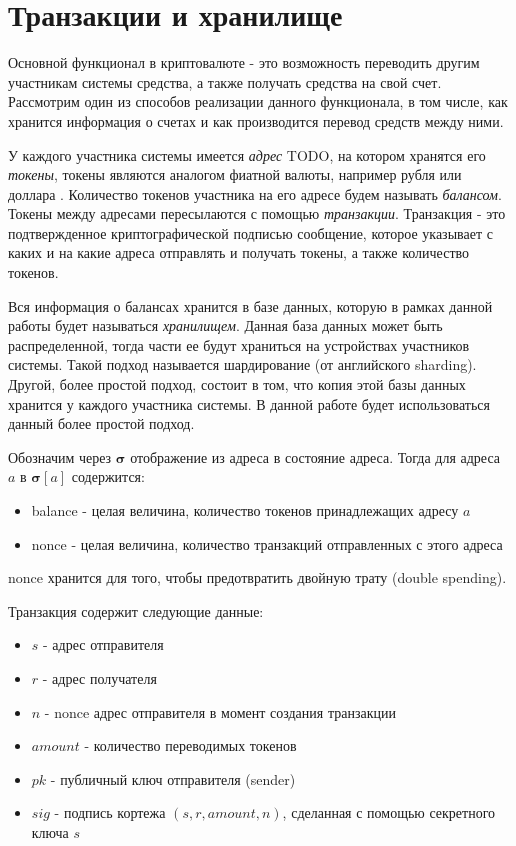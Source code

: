 \section{Транзакции и хранилище} \label{introduction:tx}
Основной функционал в криптовалюте - это возможность переводить другим участникам системы средства, а также получать средства на свой счет.
Рассмотрим один из способов реализации данного функционала,
в том числе, как хранится информация о счетах и как производится перевод средств между ними.

У каждого участника системы имеется \textit{адрес} TODO, на котором хранятся его \textit{токены}, токены
являются аналогом фиатной валюты, например рубля или доллара . Количество токенов участника на его адресе будем называть \textit{балансом}. Токены между адресами пересылаются с помощью \textit{транзакции}. Транзакция - это подтвержденное криптографической подписью сообщение, которое указывает с каких и на какие адреса отправлять и получать токены, а также количество токенов.

Вся информация о балансах хранится в базе данных, которую в рамках данной работы будет называться \textit{хранилищем}.
Данная база данных может быть распределенной, тогда части ее будут храниться на устройствах участников системы. 
Такой подход называется шардирование (от английского sharding). 
Другой, более простой подход, состоит в том, что копия этой базы данных хранится у каждого участника системы.
В данной работе будет использоваться данный более простой подход.

Обозначим через $\boldsymbol{\sigma}$ отображение из адреса в состояние адреса. Тогда для адреса $a$ в $\boldsymbol{\sigma}[a]$ содержится:
\begin{itemize}
\item balance - целая величина, количество токенов принадлежащих адресу $a$
\item nonce  - целая величина, количество транзакций отправленных с этого адреса
\end{itemize}

nonce хранится для того, чтобы предотвратить двойную трату (double spending)\cite{double-spending}.

\noindent Транзакция содержит следующие данные:
\begin{itemize}
\item $s$ - адрес отправителя
\item $r$ - адрес получателя
\item $n$ - nonce адрес отправителя в момент создания транзакции
\item $amount$ - количество переводимых токенов
\item $pk$ - публичный ключ отправителя (sender)
\item $sig$ - подпись кортежа $(s, r, amount, n)$, сделанная с помощью секретного ключа $s$
\end{itemize}

